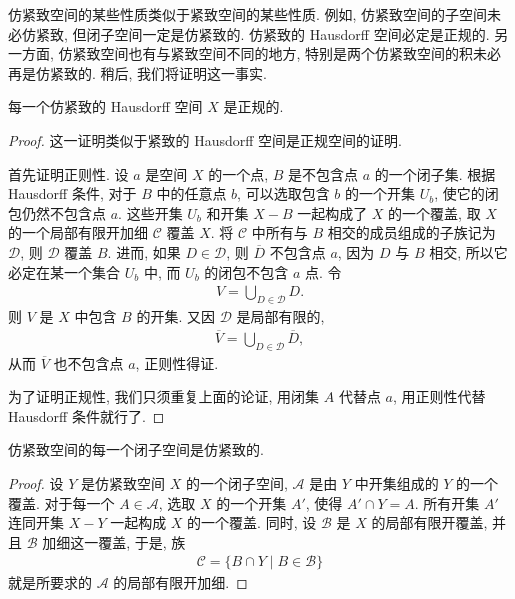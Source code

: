 \documentclass[../../main.tex]{subfiles}
\begin{document}
仿紧致空间的某些性质类似于紧致空间的某些性质. 例如, 仿紧致空间的子空间未必仿紧致, 但闭子空间一定是仿紧致的. 仿紧致的 Hausdorff 空间必定是正规的. 另一方面, 仿紧致空间也有与紧致空间不同的地方, 特别是两个仿紧致空间的积未必再是仿紧致的. 稍后, 我们将证明这一事实.

\begin{theorem}\label{theorem:ch06-paracompact-hausdorff-regular}
每一个仿紧致的 Hausdorff 空间 $X$ 是正规的.
\end{theorem}

\begin{proof}
这一证明类似于紧致的 Hausdorff 空间是正规空间的证明.

首先证明正则性. 设 $a$ 是空间 $X$ 的一个点, $B$ 是不包含点 $a$ 的一个闭子集. 根据 Hausdorff 条件, 对于 $B$ 中的任意点 $b$, 可以选取包含 $b$ 的一个开集 $U_b$, 使它的闭包仍然不包含点 $a$. 这些开集 $U_b$ 和开集 $X-B$ 一起构成了 $X$ 的一个覆盖, 取 $X$ 的一个局部有限开加细 $\mathcal{C}$ 覆盖 $X$. 将 $\mathcal{C}$ 中所有与 $B$ 相交的成员组成的子族记为 $\mathcal{D}$, 则 $\mathcal{D}$ 覆盖 $B$. 进而, 如果 $D\in\mathcal{D}$, 则 $\overline{D}$ 不包含点 $a$, 因为 $D$ 与 $B$ 相交, 所以它必定在某一个集合 $U_b$ 中, 而 $U_b$ 的闭包不包含 $a$ 点. 令
\begin{align*}
V=\bigcup_{D\in\mathcal{D}}D.
\end{align*}
则 $V$ 是 $X$ 中包含 $B$ 的开集. 又因 $\mathcal{D}$ 是局部有限的,
\begin{align*}
\overline{V}=\bigcup_{D\in\mathcal{D}}\overline{D},
\end{align*}
从而 $\overline{V}$ 也不包含点 $a$, 正则性得证.

为了证明正规性, 我们只须重复上面的论证, 用闭集 $A$ 代替点 $a$, 用正则性代替 Hausdorff 条件就行了.
\end{proof}

\begin{theorem}\label{theorem:ch06-paracompact-closed-subspace}
仿紧致空间的每一个闭子空间是仿紧致的.
\end{theorem}

\begin{proof}
设 $Y$ 是仿紧致空间 $X$ 的一个闭子空间, $\mathcal{A}$ 是由 $Y$ 中开集组成的 $Y$ 的一个覆盖. 对于每一个 $A\in\mathcal{A}$, 选取 $X$ 的一个开集 $A'$, 使得 $A'\cap Y=A$. 所有开集 $A'$ 连同开集 $X-Y$ 一起构成 $X$ 的一个覆盖. 同时, 设 $\mathcal{B}$ 是 $X$ 的局部有限开覆盖, 并且 $\mathcal{B}$ 加细这一覆盖, 于是, 族
\begin{align*}
\mathcal{C}=\{B\cap Y\mid B\in\mathcal{B}\}
\end{align*}
就是所要求的 $\mathcal{A}$ 的局部有限开加细.
\end{proof}
\end{document}
